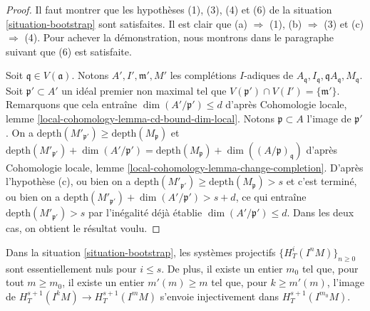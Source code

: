 \begin{proof}
Il faut montrer que les hypothèses (1), (3), (4) et (6) de la
situation \ref{situation-bootstrap} sont satisfaites.
Il est clair que (a) $\Rightarrow$ (1),
(b) $\Rightarrow$ (3) et (c) $\Rightarrow$ (4).
Pour achever la démonstration, nous montrons dans le paragraphe suivant que (6) est satisfaite.

\medskip\noindent
Soit $\mathfrak q \in V(\mathfrak a)$.
Notons $A', I', \mathfrak m', M'$
les complétions $I$-adiques de
$A_\mathfrak q, I_\mathfrak q, \mathfrak qA_\mathfrak q, M_\mathfrak q$.
Soit $\mathfrak p' \subset A'$ un idéal premier non maximal tel que
$V(\mathfrak p') \cap V(I') = \{\mathfrak m'\}$.
Remarquons que cela entraîne $\dim(A'/\mathfrak p') \leq d$
d'après Cohomologie locale, lemme \ref{local-cohomology-lemma-cd-bound-dim-local}.
Notons $\mathfrak p \subset A$ l'image de $\mathfrak p'$.
On a
$\text{depth}(M'_{\mathfrak p'}) \geq \text{depth}(M_\mathfrak p)$ et
$\text{depth}(M'_{\mathfrak p'}) +
\dim(A'/\mathfrak p') =
\text{depth}(M_\mathfrak p) +
\dim((A/\mathfrak p)_\mathfrak q)$
d'après Cohomologie locale, lemme \ref{local-cohomology-lemma-change-completion}.
D'après l'hypothèse (c), ou bien on a
$\text{depth}(M'_{\mathfrak p'}) \geq \text{depth}(M_\mathfrak p) > s$
et c'est terminé, ou bien on a
$\text{depth}(M'_{\mathfrak p'}) +
\dim(A'/\mathfrak p') > s + d$, ce qui entraîne
$\text{depth}(M'_{\mathfrak p'}) > s$ par l'inégalité déjà établie
$\dim(A'/\mathfrak p') \leq d$. Dans les deux cas, on
obtient le résultat voulu.
\end{proof}

\begin{lemma}
\label{lemma-bootstrap}
Dans la situation \ref{situation-bootstrap}, les systèmes projectifs
$\{H^i_T(I^nM)\}_{n \geq 0}$ sont essentiellement nuls pour $i \leq s$.
De plus, il existe un entier $m_0$ tel que, pour tout
$m \geq m_0$, il existe un entier $m'(m) \geq m$ tel que, pour
$k \geq m'(m)$, l'image de
$H^{s + 1}_T(I^kM) \to H^{s + 1}_T(I^mM)$
s'envoie injectivement dans $H^{s + 1}_T(I^{m_0}M)$.
\end{lemma}

